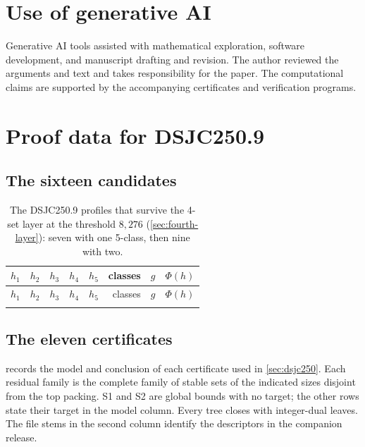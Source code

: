 \documentclass[11pt]{article}
\theoremstyle{definition}
\newcommand{\DSJCTwoFifty}{\textnormal{\textsc{DSJC250.9}}}
\begin{document}
\section*{Use of generative AI}

Generative AI tools assisted with mathematical exploration, software development, and manuscript drafting and revision. The author reviewed the arguments and text and takes responsibility for the paper. The computational claims are supported by the accompanying certificates and verification programs.

\appendix
{}

\section{Proof data for \DSJCTwoFifty{}}
\label{app:dsjc250-data}

\subsection{The sixteen candidates}

\begin{longtable}{@{}rrrrrrcr@{}}
\caption{The \DSJCTwoFifty{} profiles that survive the 4-set layer at the
threshold $8{,}276$ (\cref{sec:fourth-layer}): seven with one 5-class, then
nine with two.}\label{tab:frontier-full}\\
\toprule
$h_1$ & $h_2$ & $h_3$ & $h_4$ & $h_5$ & classes & $g$ & $\Phi(h)$\\
\midrule
\endfirsthead
\toprule
$h_1$ & $h_2$ & $h_3$ & $h_4$ & $h_5$ & classes & $g$ & $\Phi(h)$\\
\midrule
\endhead
\tabularnewline
\bottomrule
\end{longtable}

\subsection{The eleven certificates}

 records the model and conclusion of each
certificate used in \cref{sec:dsjc250}. Each residual family is the complete
family of stable sets of the indicated sizes disjoint from the top packing.
S1 and S2 are global bounds with no target; the other rows state their
target in the model column. Every tree closes with integer-dual leaves. The
file stems in the second column identify the descriptors in the companion
release.
\end{document}
